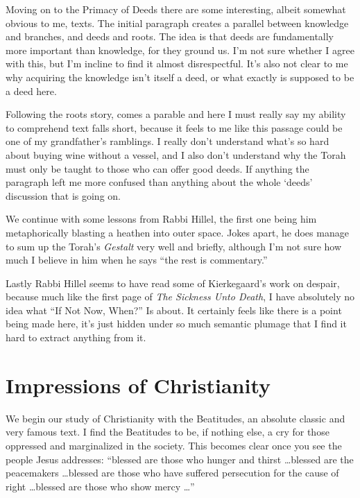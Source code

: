 \documentclass[12pt,letterpaper]{article}
\begin{document}
\begin{spacing}{2}
    Moving on to the Primacy of Deeds there are some interesting, albeit
    somewhat obvious to me, texts. The initial paragraph creates a parallel
    between knowledge and branches, and deeds and roots. The idea is that deeds
    are fundamentally more important than knowledge, for they ground us. I'm
    not sure whether I agree with this, but I'm incline to find it almost
    disrespectful. It's also not clear to me why acquiring the knowledge isn't
    itself a deed, or what exactly is supposed to be a deed here.

    Following the roots story, comes a parable and here I must really say my
    ability to comprehend text falls short, because it feels to me like this
    passage could be one of my grandfather's ramblings. I really don't
    understand what's so hard about buying wine without a vessel, and I also
    don't understand why the Torah must only be taught to those who can offer
    good deeds. If anything the paragraph left me more confused than anything
    about the whole `deeds' discussion that is going on.

    We continue with some lessons from Rabbi Hillel, the first one being him
    metaphorically blasting a heathen into outer space. Jokes apart, he does
    manage to sum up the Torah's \emph{Gestalt} very well and briefly, although
    I'm not sure how much I believe in him when he says ``the rest is
    commentary.''

    Lastly Rabbi Hillel seems to have read some of Kierkegaard's work on
    despair, because much like the first page of \emph{The Sickness Unto Death},
    I have absolutely no idea what ``If Not Now, When?'' Is about. It certainly
    feels like there is a point being made here, it's just hidden under so much
    semantic plumage that I find it hard to extract anything from it.

    \newpage
    \section{Impressions of Christianity}
    We begin our study of Christianity with the Beatitudes, an absolute classic
    and very famous text. I find the Beatitudes to be, if nothing else, a cry
    for those oppressed and marginalized in the society. This becomes clear once
    you see the people Jesus addresses: ``blessed are those who hunger and
    thirst \ldots blessed are the peacemakers \ldots blessed are those who have
    suffered persecution for the cause of right \ldots blessed are those who
    show mercy \ldots''


\end{spacing}
\end{document}

